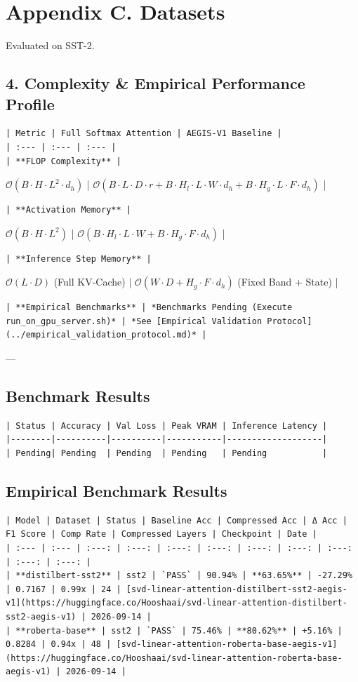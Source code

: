 \section*{Appendix C. Datasets}Evaluated on SST-2.



\subsection{4. Complexity \& Empirical Performance Profile}
\begin{verbatim}
| Metric | Full Softmax Attention | AEGIS-V1 Baseline |
| :--- | :--- | :--- |
| **FLOP Complexity** | 
\end{verbatim}$\mathcal{O}(B \cdot H \cdot L^2 \cdot d_h)$ | $\mathcal{O}(B \cdot L \cdot D \cdot r + B \cdot H_l \cdot L \cdot W \cdot d_h + B \cdot H_g \cdot L \cdot F \cdot d_h)$ |
\begin{verbatim}
| **Activation Memory** | 
\end{verbatim}$\mathcal{O}(B \cdot H \cdot L^2)$ | $\mathcal{O}(B \cdot H_l \cdot L \cdot W + B \cdot H_g \cdot F \cdot d_h)$ |
\begin{verbatim}
| **Inference Step Memory** | 
\end{verbatim}$\mathcal{O}(L \cdot D)$ (Full KV-Cache) | $\mathcal{O}(W \cdot D + H_g \cdot F \cdot d_h)$ (Fixed Band + State) |
\begin{verbatim}
| **Empirical Benchmarks** | *Benchmarks Pending (Execute run_on_gpu_server.sh)* | *See [Empirical Validation Protocol](../empirical_validation_protocol.md)* |
\end{verbatim}

---

\subsection{Benchmark Results}
\begin{verbatim}
| Status | Accuracy | Val Loss | Peak VRAM | Inference Latency |
|--------|----------|----------|-----------|-------------------|
| Pending| Pending  | Pending  | Pending   | Pending           |
\end{verbatim}

\subsection{Empirical Benchmark Results}
\begin{verbatim}
| Model | Dataset | Status | Baseline Acc | Compressed Acc | Δ Acc | F1 Score | Comp Rate | Compressed Layers | Checkpoint | Date |
| :--- | :--- | :---: | :---: | :---: | :---: | :---: | :---: | :---: | :---: | :---: |
| **distilbert-sst2** | sst2 | `PASS` | 90.94% | **63.65%** | -27.29% | 0.7167 | 0.99x | 24 | [svd-linear-attention-distilbert-sst2-aegis-v1](https://huggingface.co/Hooshaai/svd-linear-attention-distilbert-sst2-aegis-v1) | 2026-09-14 |
| **roberta-base** | sst2 | `PASS` | 75.46% | **80.62%** | +5.16% | 0.8284 | 0.94x | 48 | [svd-linear-attention-roberta-base-aegis-v1](https://huggingface.co/Hooshaai/svd-linear-attention-roberta-base-aegis-v1) | 2026-09-14 |
\end{verbatim}


